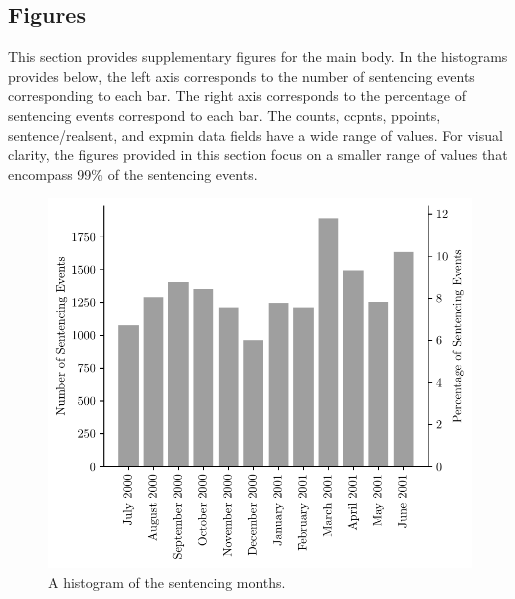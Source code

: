 \documentclass[11pt, oneside]{article}   	%
\theoremstyle{ModifiedStyle}
\begin{document}
\subsection{Figures}
\label{Sec:Appendix:Supplementary_Figures}
This section provides supplementary figures for the main body. In the histograms provides below, the left axis corresponds to the number of sentencing events corresponding to each bar. The right axis corresponds to the percentage of sentencing events correspond to each bar. The counts, ccpnts, ppoints, sentence/realsent, and expmin data fields have a wide range of values. For visual clarity, the figures provided in this section focus on a smaller range of values that encompass 99\% of the sentencing events.

\begin{figure}[H]
	\centering
	\includegraphics[scale=0.75]{Figures/Month_Histogram}
	\vspace{-2mm}
	\caption{A histogram of the sentencing months.}
	\label{Figure_Hester_Data_Month_Histogram}
\end{figure}
%
\end{document}
